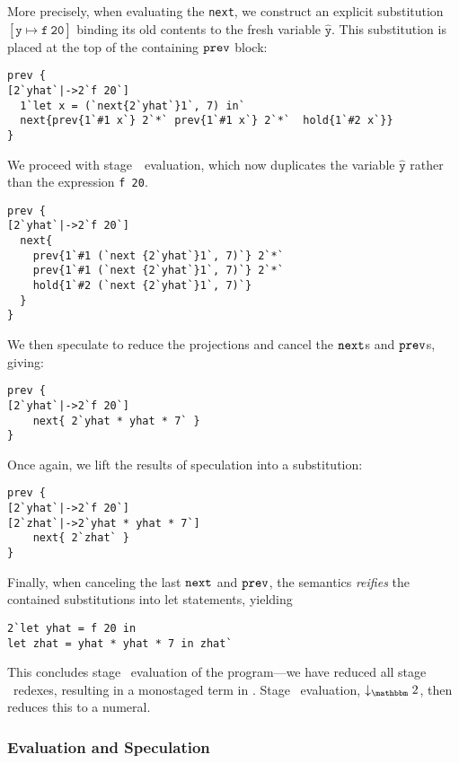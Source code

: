 More precisely, when evaluating the \verb|next|, we construct an explicit
substitution $\mathtt{[\hat y\mapsto f~20]}$ binding its old contents to the
fresh variable $\mathtt{\hat y}$. This substitution is placed at the top of the
containing ${\tt prev}$ block:
\begin{lstlisting} 
prev {
[2`yhat`|->2`f 20`]
  1`let x = (`next{2`yhat`}1`, 7) in`
  next{prev{1`#1 x`} 2`*` prev{1`#1 x`} 2`*`  hold{1`#2 x`}}
}
\end{lstlisting}
We proceed with stage~\bbone\ evaluation, which now duplicates the variable
$\mathtt{\hat y}$ rather than the expression \verb|f 20|.
\begin{lstlisting} 
prev {
[2`yhat`|->2`f 20`]
  next{
    prev{1`#1 (`next {2`yhat`}1`, 7)`} 2`*` 
    prev{1`#1 (`next {2`yhat`}1`, 7)`} 2`*`
    hold{1`#2 (`next {2`yhat`}1`, 7)`}
  }
}
\end{lstlisting}
We then speculate to reduce the projections and cancel the ${\tt next}$s and ${\tt prev}$s, giving:
\begin{lstlisting} 
prev {
[2`yhat`|->2`f 20`]
    next{ 2`yhat * yhat * 7` }
}
\end{lstlisting}
Once again, we lift the results of speculation into a substitution:
\begin{lstlisting} 
prev {
[2`yhat`|->2`f 20`]
[2`zhat`|->2`yhat * yhat * 7`]
    next{ 2`zhat` }
}
\end{lstlisting}
Finally, when canceling the last ${\tt next}$ and ${\tt prev}$, the semantics {\em reifies} the contained substitutions into let statements, yielding
\begin{lstlisting} 
2`let yhat = f 20 in
let zhat = yhat * yhat * 7 in zhat`
\end{lstlisting}

This concludes stage \bbone\ evaluation of the program---we have reduced all
stage \bbone\ redexes, resulting in a monostaged term in \langTwo. Stage \bbtwo\
evaluation, $\tworedsym$, then reduces this to a numeral.

\subsubsection{Evaluation and Speculation}
\label{ssec:dynamics}



